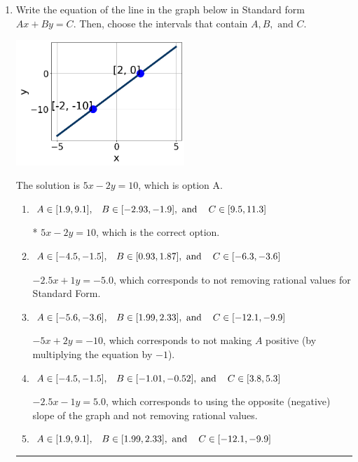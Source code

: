 \documentclass{extbook}[14pt]
\newcommand{\litem}[1]{\item #1

\rule{\textwidth}{0.4pt}}
\begin{document}
\begin{enumerate}\litem{
Write the equation of the line in the graph below in Standard form $Ax+By=C$. Then, choose the intervals that contain $A, B, \text{ and } C$.

\begin{center}
    \includegraphics[width=0.5\textwidth]{../Figures/linearGraphToStandardA.png}
\end{center}




The solution is \( 5x - 2y = 10 \), which is option A.\begin{enumerate}[label=\Alph*.]
\item \( A \in [1.9, 9.1], \hspace{3mm} B \in [-2.93, -1.9], \text{ and } \hspace{3mm} C \in [9.5, 11.3] \)

* $5x - 2y = 10$, which is the correct option.
\item \( A \in [-4.5, -1.5], \hspace{3mm} B \in [0.93, 1.87], \text{ and } \hspace{3mm} C \in [-6.3, -3.6] \)

 $-2.5x + 1y = -5.0$, which corresponds to not removing rational values for Standard Form.
\item \( A \in [-5.6, -3.6], \hspace{3mm} B \in [1.99, 2.33], \text{ and } \hspace{3mm} C \in [-12.1, -9.9] \)

 $-5x + 2y = -10$, which corresponds to not making $A$ positive (by multiplying the equation by $-1$).
\item \( A \in [-4.5, -1.5], \hspace{3mm} B \in [-1.01, -0.52], \text{ and } \hspace{3mm} C \in [3.8, 5.3] \)

 $-2.5x - 1y = 5.0$, which corresponds to using the opposite (negative) slope of the graph and not removing rational values.
\item \( A \in [1.9, 9.1], \hspace{3mm} B \in [1.99, 2.33], \text{ and } \hspace{3mm} C \in [-12.1, -9.9] \)


\end{enumerate}}
\end{enumerate}
\end{document}
